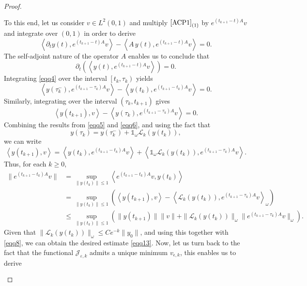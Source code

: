 \documentclass[10pt,a4paper]{amsart}
\begin{document}
\begin{proof}
\begin{enumerate}
\begin{equation}
    \end{equation}
    To this end, let us consider $v \in L^2(0,1)$ and multiply \(\eqref{ACP1}_{(1)}\) by $e^{(t_{k+1}-t)A} v$ and integrate over $(0,1)$ in order to derive
    \[\left\langle \partial_t y(t) , e^{(t_{k+1}-t)A} v \right\rangle - \left\langle A \,y(t) , e^{(t_{k+1}-t)A} v \right\rangle=0.\]
    The self-adjoint nature of the operator $A$ enables us to conclude that 
    \begin{equation}\label{eqq4}
        \partial_t \left( \left\langle y (t), e^{(t_{k+1}-t)A} v \right\rangle \right) =0.
    \end{equation}
    Integrating \eqref{eqq4} over the interval $\left[t_k , \tau_k\right)$ yields
    \begin{equation}\label{eqq5}
        \left\langle y(\tau_k^{-}) , e^{(t_{k+1}-\tau_k)A} v \right\rangle - \left\langle y(t_k) , e^{(t_{k+1}-t_k)A} v \right\rangle =0.
    \end{equation}
     Similarly, integrating over the interval  $\left(\tau_k, t_{k+1}\right)$ gives
    \begin{equation}\label{eqq6}
        \left\langle y(t_{k+1}) ,  v \right\rangle - \left\langle y(\tau_k) , e^{(t_{k+1}-\tau_k)A} v \right\rangle   =0.
    \end{equation}
    Combining the results from \eqref{eqq5} and \eqref{eqq6}, and using the fact that
    \[y(\tau_k) = y(\tau^{-}_{k}) + \mathds{1}_{\omega} \mathcal{L}_k (y(t_k)),\] 
    we can write
    \begin{equation}
        \left\langle y(t_{k+1}) , v \right\rangle = \left\langle y(t_k) , e^{(t_{k+1}-t_k)A} v \right\rangle + \left\langle \mathds{1}_{\omega} \mathcal{L}_k(y(t_k)) , e^{(t_{k+1}-\tau_k)A} v \right\rangle.
    \end{equation}
    Thus, for each $k\geq 0$,
    \begin{align*}
        \| e^{(t_{k+1}-t_k)A} v \|
        &= \sup_{\| y(t_k)\| \leq 1} \left\langle e^{(t_{k+1}-t_k)A} v , y(t_k) \right\rangle\nonumber\\
        &=\sup_{\| y(t_k)\| \leq 1} \left( \left\langle y(t_{k+1}) , v \right\rangle - \left\langle \mathcal{L}_k (y(t_k)) , e^{(t_{k+1}-\tau_k ) A} v \right\rangle_{\omega} \right)\nonumber\\
        &\leq \sup_{\| y(t_k)\| \leq 1} \left( \| y(t_{k+1})\| \| v\| + \| \mathcal{L}_k (y(t_k)) \|_{\omega} \| e^{(t_{k+1}-\tau_k)A} v\|_{\omega} \right).
    \end{align*}
    Given that $\| \mathcal{L}_k (y(t_k)) \|_{\omega} \leq C e^{-k} \| y_0\|$, and using this together with \eqref{eqq8}, we can obtain the desired estimate \eqref{eqq13}. Now, let us turn back to the fact that the functional $\mathcal{J}_{\varepsilon,k}$ admits a unique minimum $v_{\epsilon,k}$, this enables us to derive

\end{enumerate}
\end{proof}
\end{document}
